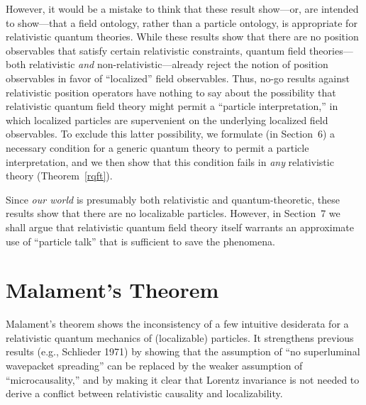 \documentclass[12pt]{article}
\theoremstyle{remark}
\begin{document}
However, it would be a mistake to think that these result show---or,
are intended to show---that a field ontology, rather than a particle
ontology, is appropriate for relativistic quantum theories.  While
these results show that there are no position observables that satisfy
certain relativistic constraints, quantum field theories---both
relativistic \emph{and} non-relativistic---already reject the notion
of position observables in favor of ``localized'' field observables.
Thus, no-go results against relativistic position operators have
nothing to say about the possibility that relativistic quantum field
theory might permit a ``particle interpretation,'' in which localized
particles are supervenient on the underlying localized field
observables.  To exclude this latter possibility, we formulate (in
Section~6) a necessary condition for a generic quantum theory to
permit a particle interpretation, and we then show that this condition
fails in \emph{any} relativistic theory (Theorem~\ref{rqft}).

Since \emph{our world} is presumably both relativistic and
quantum-theoretic, these results show that there are no localizable
particles.  However, in Section~7 we shall argue that relativistic
quantum field theory itself warrants an approximate use of ``particle
talk'' that is sufficient to save the phenomena.

\section{Malament's Theorem}
Malament's theorem shows the inconsistency of a few intuitive
desiderata for a relativistic quantum mechanics of (localizable)
particles.  It strengthens previous results (e.g., Schlieder 1971) by
showing that the assumption of ``no superluminal wavepacket
spreading'' can be replaced by the weaker assumption of
``microcausality,'' and by making it clear that Lorentz invariance is
not needed to derive a conflict between relativistic causality and
localizability.
\end{document}

